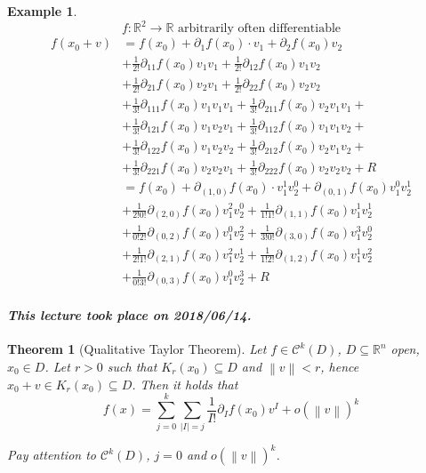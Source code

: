 \documentclass{article}
\newtheorem{theorem}{Theorem}  \numberwithin{theorem}{section}
\newtheorem{example}{Example}  \numberwithin{example}{section}
\newcommand{\norm}[1]{\left\|#1\right\|}
\newcommand{\card}[1]{\left|#1\right|}
\newcommand{\dateref}[1]{\paragraph{\textit{This lecture took place on #1.}}}
\begin{document}
\begin{example}
  \[ f: \mathbb R^2 \to \mathbb R \text{ arbitrarily often differentiable} \]
  \begin{align*}
    f(x_0 + v) &= f(x_0) + \partial_1 f(x_0) \cdot v_1 + \partial_2 f(x_0) v_2 \\
      &+ \frac1{2!} \partial_{11} f(x_0) v_1 v_1 + \frac{1}{2!} \partial_{12} f(x_0) v_1 v_2 \\
      &+ \frac{1}{2!} \partial_{21} f(x_0) v_2 v_1 + \frac{1}{2!} \partial_{22} f(x_0) v_2 v_2 \\
      &+ \frac{1}{3!} \partial_{111} f(x_0) v_1 v_1 v_1 + \frac{1}{3!} \partial_{211} f(x_0) v_2 v_1 v_1 + \\
      &+ \frac{1}{3!} \partial_{121} f(x_0) v_1 v_2 v_1 + \frac{1}{3!} \partial_{112} f(x_0) v_1 v_1 v_2 + \\
      &+ \frac{1}{3!} \partial_{122} f(x_0) v_1 v_2 v_2 + \frac{1}{3!} \partial_{212} f(x_0) v_2 v_1 v_2 + \\
      &+ \frac{1}{3!} \partial_{221} f(x_0) v_2 v_2 v_1 + \frac{1}{3!} \partial_{222} f(x_0) v_2 v_2 v_2 + R \\
      &= f(x_0) + \partial_{(1,0)} f(x_0) \cdot v_1^1 v_2^0 + \partial_{(0,1)} f(x_0) v_1^0 v_2^1 \\
      &+ \frac{1}{2! 0!} \partial_{(2,0)} f(x_0) v_1^2 v_2^0 + \frac{1}{1! 1!} \partial_{(1,1)} f(x_0) v_1^1 v_2^1 \\
      &+ \frac{1}{0! 2!} \partial_{(0,2)} f(x_0) v_1^0 v_2^2 + \frac{1}{3! 0!} \partial_{(3,0)} f(x_0) v_1^3 v_2^0 \\
      &+ \frac{1}{2! 1!} \partial_{(2,1)} f(x_0) v_1^2 v_2^1 + \frac{1}{1! 2!} \partial_{(1,2)} f(x_0) v_1^1 v_2^2 \\
      &+ \frac{1}{0! 3!} \partial_{(0,3)} f(x_0) v_1^0 v_2^3 + R
  \end{align*}
\end{example}

\dateref{2018/06/14}

\begin{theorem}[Qualitative Taylor Theorem] %
  Let $f \in \mathcal C^k(D)$, $D \subseteq \mathbb R^n$ open, $x_0 \in D$.
  Let $r > 0$ such that $K_r(x_0) \subseteq D$ and $\norm{v} < r$, hence $x_0 + v \in K_r(x_0) \subseteq D$.
  Then it holds that
  \[ f(x) = \sum_{j=0}^k \sum_{\card{I} = j} \frac{1}{I!} \partial_I f(x_0) v^I + o(\norm{v})^k \]

  Pay attention to $\mathcal C^k(D)$, $j=0$ and $o(\norm{v})^k$.
\end{theorem}
\end{document}
